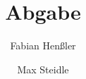 \documentclass[10pt,twocolumn,letterpaper]{article}
\title{Abgabe \confName}
\author{Fabian Henßler
\and
Max Steidle
}
\begin{document}
\maketitle







{
    \small
    
    
}

\appendix


\end{document}
